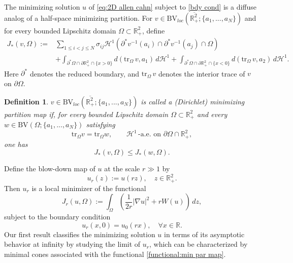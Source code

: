 \documentclass[leqno,11pt]{amsart}
\let\pa=\partial
\let\f=\frac
\let\Om=\Omega
\let\pa=\partial
\let\na=\nabla
\newtheorem{definition}[theorem]{Definition}
\theoremstyle{remark}
\newcommand{\BR}{\mathbb{R}}
\newcommand{\ch}{\mathcal{H}^1}
\begin{document}
The minimizing solution $u$ of \eqref{eq:2D allen cahn} subject to \eqref{bdy cond} is a diffuse analog of a half-space minimizing partition. For $v\in \mathrm{BV}_{loc}(\overline{\BR_+^2}; \{a_1,...,a_N\})$ and for every bounded Lipschitz domain $\Omega\subset \BR_+^2$, define 
\begin{equation}\label{functional:min par map}
\begin{split}
 J_*(v,\Om):= &  \sum\limits_{1\leq i<j\leq N}\sigma_{ij}\mathcal{H}^1(\pa^* v^{-1}(a_i)\cap\pa^*v^{-1}(a_j)\cap \Om)\\
 &+ \int_{\pa^* \Om\cap \pa \BR_+^2\cap\{x>0\}} d(\mathrm{tr}_\Om\,v,a_1)\,d\ch+ \int_{\pa^* \Om\cap \pa \BR_+^2\cap\{x<0\}} d(\mathrm{tr}_\Om\,v,a_2)\,d\ch.
 \end{split}
\end{equation}
Here $\pa^*$ denotes the reduced boundary, and $\mathrm{tr}_\Om\,v$ denotes the interior trace of $v$ on $\pa\Om$.

\begin{definition}\label{def: min par map}
$v\in  \mathrm{BV}_{loc}(\overline{\BR_+^2}; \{a_1,...,a_N\})$ is called a (Dirichlet) \emph{minimizing partition map} if, for every bounded Lipschitz domain $\Om\subset \BR_+^2$ and every $w\in \mathrm{BV}(\Om;\{a_1,...,a_N\})$ satisfying 
\begin{equation*}
    \mathrm{tr}_\Om v=\mathrm{tr}_\Om w,\qquad \ch\,\text{-a.e. on }\pa \Om\cap \BR_+^2,
\end{equation*}
one has
\begin{equation*}
    J_*(v,\Omega)\leq J_*(w,\Omega).
\end{equation*}    
\end{definition}

Define the blow-down map of $u$ at the scale $r\gg 1$ by
\begin{equation*}
    u_r(z):= u(rz),\quad z\in \BR_+^2.
\end{equation*}
Then $u_r$ is a local minimizer of the functional
\begin{equation*}
    J_r(u,\Omega):=\int_{\Omega} \left(\f{1}{2r}|\na u|^2+r W(u)\right)\,dz,
\end{equation*}
subject to the boundary condition 
\begin{equation*}
    u_r(x,0)= u_0(rx),\quad \forall x\in\BR.
\end{equation*}
Our first result classifies the minimizing solution $u$ in terms of its asymptotic behavior at infinity by studying the limit of $u_r$, which can be characterized by minimal cones associated with the functional \eqref{functional:min par map}.
\end{document}
